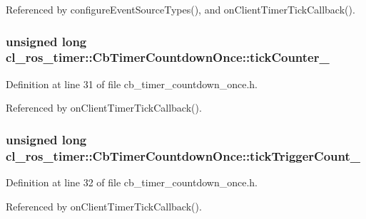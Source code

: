 Referenced by configure\+Event\+Source\+Types(), and on\+Client\+Timer\+Tick\+Callback().

\subsubsection[{\texorpdfstring{tick\+Counter\+\_\+}{tickCounter_}}]{\setlength{\rightskip}{0pt plus 5cm}unsigned long cl\+\_\+ros\+\_\+timer\+::\+Cb\+Timer\+Countdown\+Once\+::tick\+Counter\+\_\+\hspace{0.3cm}{\ttfamily [private]}}\hypertarget{classcl__ros__timer_1_1CbTimerCountdownOnce_aea7372342782a0b6a1ba50b07ccb0962}{}\label{classcl__ros__timer_1_1CbTimerCountdownOnce_aea7372342782a0b6a1ba50b07ccb0962}


Definition at line 31 of file cb\+\_\+timer\+\_\+countdown\+\_\+once.\+h.



Referenced by on\+Client\+Timer\+Tick\+Callback().

\subsubsection[{\texorpdfstring{tick\+Trigger\+Count\+\_\+}{tickTriggerCount_}}]{\setlength{\rightskip}{0pt plus 5cm}unsigned long cl\+\_\+ros\+\_\+timer\+::\+Cb\+Timer\+Countdown\+Once\+::tick\+Trigger\+Count\+\_\+\hspace{0.3cm}{\ttfamily [private]}}\hypertarget{classcl__ros__timer_1_1CbTimerCountdownOnce_aa3ab9c795f42141990ca69749a1ec010}{}\label{classcl__ros__timer_1_1CbTimerCountdownOnce_aa3ab9c795f42141990ca69749a1ec010}


Definition at line 32 of file cb\+\_\+timer\+\_\+countdown\+\_\+once.\+h.



Referenced by on\+Client\+Timer\+Tick\+Callback().

